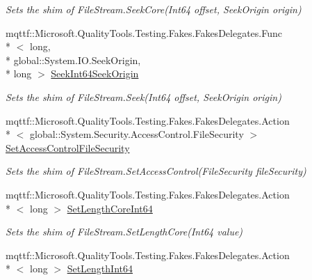 \begin{DoxyCompactItemize}
\begin{DoxyCompactList}\small\item\em Sets the shim of File\-Stream.\-Seek\-Core(\-Int64 offset, Seek\-Origin origin)\end{DoxyCompactList}\item 
mqttf\-::\-Microsoft.\-Quality\-Tools.\-Testing.\-Fakes.\-Fakes\-Delegates.\-Func\\*
$<$ long, \\*
global\-::\-System.\-I\-O.\-Seek\-Origin, \\*
long $>$ \hyperlink{class_system_1_1_i_o_1_1_fakes_1_1_shim_file_stream_a40433417dbecaf685cd629c4c7289bf1}{Seek\-Int64\-Seek\-Origin}
\begin{DoxyCompactList}\small\item\em Sets the shim of File\-Stream.\-Seek(\-Int64 offset, Seek\-Origin origin)\end{DoxyCompactList}\item 
mqttf\-::\-Microsoft.\-Quality\-Tools.\-Testing.\-Fakes.\-Fakes\-Delegates.\-Action\\*
$<$ global\-::\-System.\-Security.\-Access\-Control.\-File\-Security $>$ \hyperlink{class_system_1_1_i_o_1_1_fakes_1_1_shim_file_stream_a6b6deffaeb32316857082b409f352597}{Set\-Access\-Control\-File\-Security}
\begin{DoxyCompactList}\small\item\em Sets the shim of File\-Stream.\-Set\-Access\-Control(\-File\-Security file\-Security)\end{DoxyCompactList}\item 
mqttf\-::\-Microsoft.\-Quality\-Tools.\-Testing.\-Fakes.\-Fakes\-Delegates.\-Action\\*
$<$ long $>$ \hyperlink{class_system_1_1_i_o_1_1_fakes_1_1_shim_file_stream_ad0b643833566ce778a332379431c0ea6}{Set\-Length\-Core\-Int64}
\begin{DoxyCompactList}\small\item\em Sets the shim of File\-Stream.\-Set\-Length\-Core(\-Int64 value)\end{DoxyCompactList}\item 
mqttf\-::\-Microsoft.\-Quality\-Tools.\-Testing.\-Fakes.\-Fakes\-Delegates.\-Action\\*
$<$ long $>$ \hyperlink{class_system_1_1_i_o_1_1_fakes_1_1_shim_file_stream_a57c0008adba8b9db41f66c03baad28ff}{Set\-Length\-Int64}

\end{DoxyCompactItemize}
